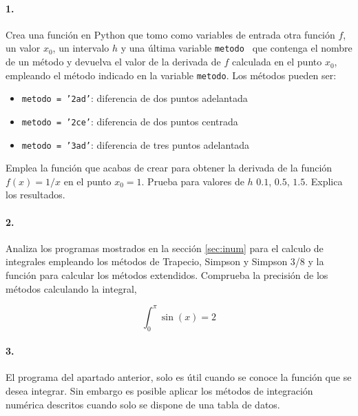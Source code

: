\paragraph{1.} Crea una función en Python que tomo como variables de entrada otra función $f$, un valor $x_0$, un intervalo $h$ y una última variable \texttt{metodo } que contenga el nombre de un método y devuelva el valor de la derivada de $f$ calculada en el punto $x_0$, empleando el método indicado en la variable \texttt{metodo}.  Los métodos pueden ser:
\begin{itemize}
\item \texttt{metodo = '2ad'}: diferencia de dos puntos adelantada
\item \texttt{metodo = '2ce'}: diferencia de dos puntos centrada
\item \texttt{metodo = '3ad'}: diferencia de tres puntos adelantada
\end{itemize}
Emplea la función que acabas de crear para obtener la derivada de la función $f(x) = 1/x$ en el punto $x_0 = 1$. Prueba para valores de $h$ $0.1$, $0.5$, $1.5$. Explica los resultados. 

\paragraph{2.} Analiza los programas mostrados en la sección \ref{sec:inum} para el calculo de integrales empleando los métodos de Trapecio, Simpson y Simpson 3/8 y la función para calcular los métodos extendidos. Comprueba la precisión de los métodos calculando la integral,

\begin{equation*}
\int_0^{\pi} \sin(x) = 2
\end{equation*}
	
\paragraph{3.} El programa del apartado anterior, solo es útil cuando se conoce la función que se desea integrar. Sin embargo es posible aplicar los métodos de integración numérica descritos cuando solo se dispone de una tabla de datos. 


